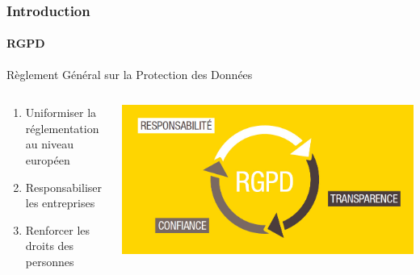 \documentclass[aspectratio=169]{beamer}
\begin{document}
\begin{frame}
    \frametitle{Introduction}
    \framesubtitle{RGPD}
    \begin{center}
        Règlement Général sur la Protection des Données
    \end{center}
    \begin{columns}
        \hfill
        \begin{column}{0.45\textwidth}
            \begin{enumerate}
                \item<1-> Uniformiser la réglementation au niveau européen
                \item<2-> Responsabiliser les entreprises
                \item<3-> Renforcer les droits des personnes
            \end{enumerate}
        \end{column}
        \begin{column}{0.5\textwidth}
            \begin{center}
                \includegraphics[width=1.0\textwidth]{RGPD.jpg}
            \end{center}
        \end{column}
    \end{columns}
\end{frame}
\end{document}
